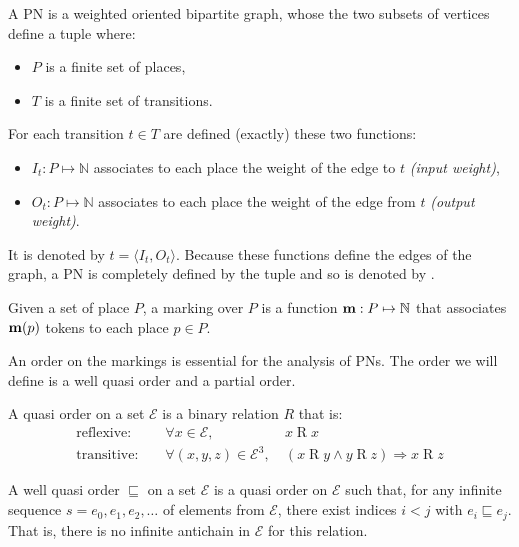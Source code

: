 \begin{defi}[\acl{PN}]
  A \acf{PN} \tupleN is a weighted oriented bipartite graph, whose the two subsets of vertices define a tuple \PT where:
  \begin{itemize}
    \item $P$ is a finite set of places,
    \item $T$ is a finite set of transitions.
  \end{itemize}
  For each transition $t \in T$ are defined (exactly) these two functions:
  \begin{itemize}
    \item $I_t : P \mapsto \mathbb{N}$ associates to each place the weight of the edge to $t$ \emph{(input weight)},
    \item $O_t : P \mapsto \mathbb{N}$ associates to each place the weight of the edge from $t$ \emph{(output weight)}.
  \end{itemize}
  It is denoted by $t = \langle I_t, O_t \rangle$.
  Because these functions define the edges of the graph, a \ac{PN} is completely defined by the tuple \PT and so is denoted by \NPT.
\end{defi}

\begin{defi}[marking]
  Given a set of place $P$, a marking over $P$ is a function $\mathbf{m} : P \mapsto \mathbb{N}$ that associates $\mathbf{m}(p)$ tokens to each place $p \in P$.
\end{defi}

An order on the markings is essential for the analysis of \acp{PN}. The order we will define is a well quasi order and a partial order.

\begin{defi}
  A quasi order on a set $\mathcal{E}$ is a binary relation $R$ that is:
  \begin{align*}
    \text{reflexive: } &&\forall x \in \mathcal{E},\ & x \mathrel{R} x \\
    \text{transitive: } &&\forall (x, y, z) \in \mathcal{E}^3,\ & (x \mathrel{R} y\land y \mathrel{R} z)\Rightarrow x \mathrel{R} z
  \end{align*}
\end{defi}

\begin{defi}
  A well quasi order $\sqsubseteq$ on a set $\mathcal{E}$ is a quasi order on $\mathcal{E}$ such that, for any infinite sequence $s = e_0, e_1, e_2, \dots$ of elements from $\mathcal{E}$, there exist indices $i < j$ with $e_i \sqsubseteq e_j$. That is, there is no infinite antichain in $\mathcal{E}$ for this relation.
\end{defi}

